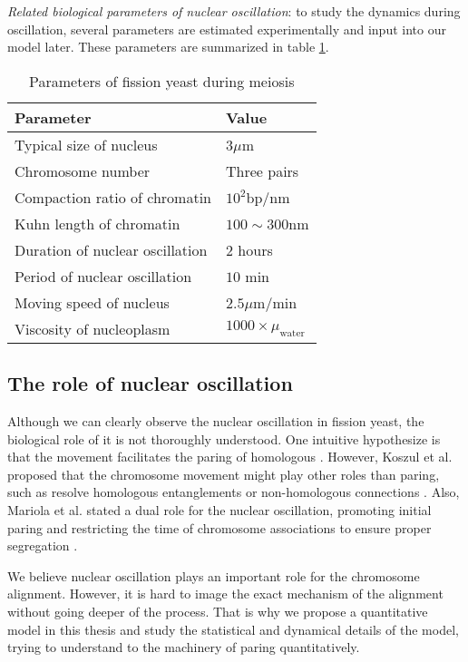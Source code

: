 \emph{Related biological parameters of nuclear oscillation}: to study the dynamics during oscillation, several parameters are estimated experimentally and input into our model later. These parameters are summarized in table \ref{tab:parameters}.

\begin{table}[htpb]
    \centering
    \caption{Parameters of fission yeast during meiosis}
    \label{tab:parameters}
    \begin{tabular}{l|l}
        \hline
        \textbf{Parameter} & \textbf{Value} \\
        \hline
        Typical size of nucleus          &  $3\mu$m \\
        Chromosome number                &  Three pairs \\
        Compaction ratio of chromatin    &  $10^2$bp/nm \\
        Kuhn length of chromatin         &  $100\sim300$nm  \\
        Duration of nuclear oscillation  &  $2$ hours  \\
        Period of nuclear oscillation    &  $10$ min  \\
        Moving speed of nucleus          &  $2.5\mu$m/min \\
        Viscosity of nucleoplasm         &  $1000\times \mu_{\text{water}}$ \\
        \hline
    \end{tabular}
\end{table}


\subsection{The role of nuclear oscillation}
\label{sub:the_role_of_nuclear_oscillation}

Although we can clearly observe the nuclear oscillation in fission yeast, the biological role of it is not thoroughly understood. One intuitive hypothesize is that the movement facilitates the paring of homologous \cite{Ding2004}. However, Koszul et al. proposed that the chromosome movement might play other roles than paring, such as resolve homologous entanglements or non-homologous connections \cite{Koszul2009a}. Also, Mariola et al. stated a dual role for the nuclear oscillation, promoting initial paring and restricting the time of chromosome associations to ensure proper segregation \cite{Chacon2016}. 

We believe nuclear oscillation plays an important role for the chromosome alignment. However, it is hard to image the exact mechanism of the alignment without going deeper of the process. That is why we propose a quantitative model in this thesis and study the statistical and dynamical details of the model, trying to understand to the machinery of paring quantitatively. 



